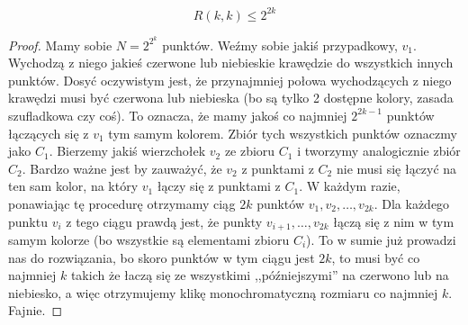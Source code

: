 \begin{theorem}
	\begin{equation}
		R(k,k) \leq 2^{2k}
	\end{equation}
\end{theorem}

\begin{proof}
	Mamy sobie $N = 2^{2^k}$ punktów. Weźmy sobie jakiś przypadkowy, $v_1$. Wychodzą z niego jakieś czerwone lub niebieskie krawędzie do wszystkich innych punktów. Dosyć oczywistym jest, że przynajmniej połowa wychodzących z niego krawędzi musi być czerwona lub niebieska (bo są tylko 2 dostępne kolory, zasada szufladkowa czy coś). To oznacza, że mamy jakoś co najmniej $2^{2k-1}$ punktów łączących się z $v_1$ tym samym kolorem. Zbiór tych wszystkich punktów oznaczmy jako $C_1$. Bierzemy jakiś wierzchołek $v_2$ ze zbioru $C_1$ i tworzymy analogicznie zbiór $C_2$. Bardzo ważne jest by zauważyć, że $v_2$ z punktami z $C_2$ nie musi się łączyć na ten sam kolor, na który $v_1$ łączy się z punktami z $C_1$. W każdym razie, ponawiając tę procedurę otrzymamy ciąg $2k$ punktów $v_1, v_2, \dots, v_{2k}$. Dla każdego punktu $v_i$ z tego ciągu prawdą jest, że punkty $v_{i+1}, \dots, v_{2k}$ łączą się z nim w tym samym kolorze (bo wszystkie są elementami zbioru $C_i$). To w sumie już prowadzi nas do rozwiązania, bo skoro punktów w tym ciągu jest $2k$, to musi być co najmniej $k$ takich że łaczą się ze wszystkimi ,,późniejszymi'' na czerwono lub na niebiesko, a więc otrzymujemy klikę monochromatyczną rozmiaru co najmniej $k$. Fajnie.
\end{proof}